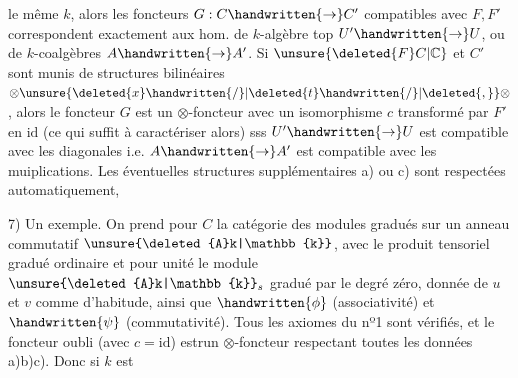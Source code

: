 le même $k$,  alors les foncteurs $G:C\handwritten{\to} C'$ compatibles avec $F,F'$ correspondent exactement aux hom. de $k$-algèbre top $U'\handwritten{\to}U$, ou de $k$-coalgèbres $A\handwritten{\to}A'$. Si $\unsure{\deleted{F}C|\mathbb{C}}$ et $C'$ sont munis de structures bilinéaires $\otimes\unsure{\deleted{x}\handwritten{/}|\deleted{t}\handwritten{/}|\deleted{,}}\otimes$, alors le foncteur $G$ est un $\otimes$-foncteur avec un isomorphisme $c$ transformé par $F'$ en $\mathrm{id}$ (ce qui suffit à  caractériser alors) sss $U'\handwritten{\to}U$ est compatible avec les diagonales i.e. $A\handwritten{\to}A'$ est compatible avec les muiplications. Les éventuelles structures supplémentaires a) ou c) sont respectées automatiquement,




7) Un exemple. On prend pour $C$ la catégorie des modules gradués sur un anneau commutatif $\unsure{\deleted{A}k|\mathbb{k}}$, avec le produit tensoriel gradué ordinaire et pour unité le module $\unsure{\deleted{A}k|\mathbb{k}}_s$ gradué par le degré zéro, donnée de $u$ et $v$ comme d'habitude, ainsi que $\handwritten{\phi}$ (associativité) et $\handwritten{\psi}$ (commutativité). Tous les axiomes du nº1 sont vérifiés, et le foncteur oubli (avec $c=\mathrm{id}$) estrun $\otimes$-foncteur respectant toutes les données a)b)c). Donc si $k$ est
